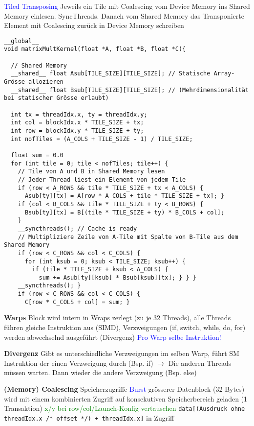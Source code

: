 \textcolor{blue}{Tiled Transposing} Jeweils ein Tile mit Coalescing vom Device Memory ins Shared Memory einlesen. SyncThreads. Danach vom Shared Memory das Transponierte Element mit Coalescing zurück in Device Memory schreiben

\begin{lstlisting}
__global__
void matrixMultKernel(float *A, float *B, float *C){

  // Shared Memory
  __shared__ float Asub[TILE_SIZE][TILE_SIZE]; // Statische Array-Grösse allozieren
  __shared__ float Bsub[TILE_SIZE][TILE_SIZE]; // (Mehrdimensionalität bei statischer Grösse erlaubt)

  int tx = threadIdx.x, ty = threadIdx.y;
  int col = blockIdx.x * TILE_SIZE + tx;
  int row = blockIdx.y * TILE_SIZE + ty;
  int nofTiles = (A_COLS + TILE_SIZE - 1) / TILE_SIZE;

  float sum = 0.0
  for (int tile = 0; tile < nofTiles; tile++) {
    // Tile von A und B in Shared Memory lesen
    // Jeder Thread liest ein Element von jedem Tile
    if (row < A_ROWS && tile * TILE_SIZE + tx < A_COLS) {
      Asub[ty][tx] = A[row * A_COLS + tile * TILE_SIZE + tx]; }
    if (col < B_COLS && tile * TILE_SIZE + ty < B_ROWS) {
      Bsub[ty][tx] = B[(tile * TILE_SIZE + ty) * B_COLS + col];
    }
    __syncthreads(); // Cache is ready
    // Multipliziere Zeile von A-Tile mit Spalte von B-Tile aus dem Shared Memory
    if (row < C_ROWS && col < C_COLS) {
      for (int ksub = 0; ksub < TILE_SIZE; ksub++) {
        if (tile * TILE_SIZE + ksub < A_COLS) {
          sum += Asub[ty][ksub] * Bsub[ksub][tx]; } } }
    __syncthreads(); }
    if (row < C_ROWS && col < C_COLS) {
      C[row * C_COLS + col] = sum; }
\end{lstlisting}


\textbf{Warps}
Block wird intern in Wraps zerlegt (zu je 32 Threads), alle Threads führen gleiche Instruktion aus (SIMD), Verzweigungen (if, switch, while, do, for) werden abwechselnd ausgeführt (Divergenz) \textcolor{blue}{Pro Warp selbe Instruktion!}

\textbf{Divergenz}
Gibt es unterschiedliche Verzweigungen im selben Warp, führt SM Instruktion der einen Verzweigung durch (Bsp. if) $\rightarrow$ Die anderen Threads müssen warten. Dann wieder die andere Verzweigung (Bsp. else)


\textbf{(Memory) Coalescing} Speicherzugriffe \textcolor{blue}{Burst} grösserer Datenblock (32 Bytes) wird mit einem kombinierten Zugriff auf konsekutiven Speicherbereich geladen (1 Transaktion) \textcolor{green}{x/y bei row/col/Launch-Konfig vertauschen} \lstinline{data[(Ausdruck ohne threadIdx.x /* offset */) + threadIdx.x]} in Zugriff
